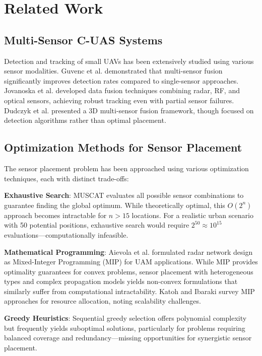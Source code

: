 
\section{Related Work}

\subsection{Multi-Sensor C-UAS Systems}

Detection and tracking of small UAVs has been extensively studied using various sensor modalities. Guvenc et al. \cite{guvenc2018detection} demonstrated that multi-sensor fusion significantly improves detection rates compared to single-sensor approaches. Jovanoska et al. \cite{jovanoska2018multisensor} developed data fusion techniques combining radar, RF, and optical sensors, achieving robust tracking even with partial sensor failures. Dudczyk et al. \cite{dudczyk2022multisensor} presented a 3D multi-sensor fusion framework, though focused on detection algorithms rather than optimal placement.

\subsection{Optimization Methods for Sensor Placement}

The sensor placement problem has been approached using various optimization techniques, each with distinct trade-offs:

\textbf{Exhaustive Search}: MUSCAT \cite{muscat2023} evaluates all possible sensor combinations to guarantee finding the global optimum. While theoretically optimal, this $O(2^n)$ approach becomes intractable for $n > 15$ locations. For a realistic urban scenario with 50 potential positions, exhaustive search would require $2^{50} \approx 10^{15}$ evaluations—computationally infeasible.

\textbf{Mathematical Programming}: Aievola et al. \cite{aievola2022ground} formulated radar network design as Mixed-Integer Programming (MIP) for UAM applications. While MIP provides optimality guarantees for convex problems, sensor placement with heterogeneous types and complex propagation models yields non-convex formulations that similarly suffer from computational intractability. Katoh and Ibaraki \cite{katoh1998resource} survey MIP approaches for resource allocation, noting scalability challenges.

\textbf{Greedy Heuristics}: Sequential greedy selection offers polynomial complexity but frequently yields suboptimal solutions, particularly for problems requiring balanced coverage and redundancy—missing opportunities for synergistic sensor placement.

